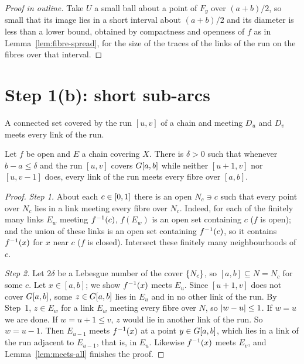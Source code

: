 \begin{proof}[Proof in outline]
Take $U$ a small ball about a point of $F_y$ over $(a+b)/2$, so small that its image lies in a short interval about $(a+b)/2$ and its diameter is less than a
lower bound, obtained by compactness and openness of $f$ as in Lemma~\ref{lem:fibre-spread}, for the size of the traces of the links of the run on the fibres
over that interval.
\end{proof}


\section{Step 1(b): short sub-arcs}

\begin{lemma}\label{lem:meets-all}
A connected set covered by the run $[u,v]$ of a chain and meeting $D_u$ and $D_v$ meets every link of the run.
\end{lemma}


\begin{theorem}\label{thm:step1b}
Let $f$ be open and $E$ a chain covering $X$. There is $\delta>0$ such that whenever $b-a\le\delta$ and the run $[u,v]$ covers $G[a,b]$ while neither $[u+1,v]$ nor
$[u,v-1]$ does, every link of the run meets every fibre over $[a,b]$.
\end{theorem}

\begin{proof}
\emph{Step 1.} About each $c\in[0,1]$ there is an open $N_c\ni c$ such that every point over $N_c$ lies in a link meeting every fibre over $N_c$. Indeed, for each of
the finitely many links $E_w$ meeting $f^{-1}(c)$, $f(E_w)$ is an open set containing $c$ ($f$ is open); and the union of these links is an open set containing
$f^{-1}(c)$, so it contains $f^{-1}(x)$ for $x$ near $c$ ($f$ is closed). Intersect these finitely many neighbourhoods of $c$.

\emph{Step 2.} Let $2\delta$ be a Lebesgue number of the cover $\left\{ N_c \right\}$, so $[a,b]\subseteq N=N_c$ for some $c$. Let $x\in[a,b]$; we show $f^{-1}(x)$ meets $E_u$.
Since $[u+1,v]$ does not cover $G[a,b]$, some $z\in G[a,b]$ lies in $E_u$ and in no other link of the run. By Step~1, $z\in E_w$ for a link $E_w$ meeting every fibre
over $N$, so $\left\lvert w-u\right\rvert\le1$. If $w=u$ we are done. If $w=u+1\le v$, $z$ would lie in another link of the run. So $w=u-1$. Then $E_{u-1}$ meets $f^{-1}(x)$ at a
point $y\in G[a,b]$, which lies in a link of the run adjacent to $E_{u-1}$, that is, in $E_u$. Likewise $f^{-1}(x)$ meets $E_v$, and Lemma~\ref{lem:meets-all}
finishes the proof.
\end{proof}

